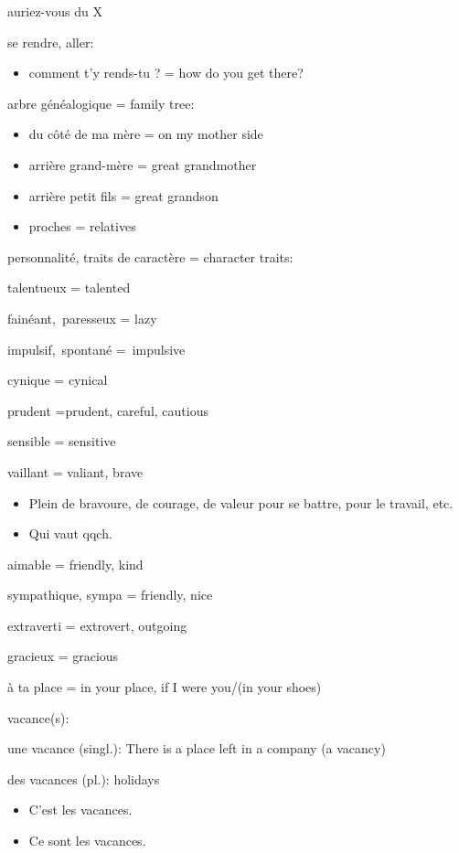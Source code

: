 {auriez-vous du X}

se rendre, aller:

\begin{itemize}
\item
  comment t'y rends-tu ? = how do you get there?
\end{itemize}

arbre généalogique = family tree:

\begin{itemize}
\item
  du côté de ma mère = on my mother side
\item
  arrière grand-mère = great grandmother
\item
  arrière petit fils = great grandson
\item
  proches = relatives
\end{itemize}

personnalité, traits de caractère = character traits:

talentueux = talented

fainéant,~paresseux = lazy

impulsif,~spontané =~impulsive

cynique = cynical

prudent =prudent, careful, cautious

sensible = sensitive

vaillant = valiant, brave

\begin{itemize}
\item
  Plein de {bravoure}, de courage, de valeur pour se battre, pour le
  travail, etc.
\item
  Qui {vaut} qqch.
\end{itemize}

aimable = friendly, kind

sympathique, sympa = friendly, nice

extraverti = extrovert, outgoing

gracieux = gracious

à ta place = in your place, if I were you/(in your shoes)

vacance(s):

une vacance (singl.): There is a place left in a company (a vacancy)

des vacances (pl.): holidays

\begin{itemize}
\item
  C'est les vacances.
\item
  Ce sont les vacances.~
\end{itemize}

